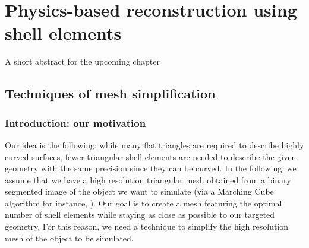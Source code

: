 \chapter{Physics-based reconstruction using shell elements}
\label{chap10}
\begin{shortAbstract}
A short abstract for the upcoming chapter \\
\end{shortAbstract}


\section{Techniques of mesh simplification}

\subsection{Introduction: our motivation}

Our idea is the following: while many flat triangles are required to describe highly curved surfaces, fewer triangular shell elements are needed to describe the given geometry with the same precision since they can be curved. In the following, we assume that we have a high resolution triangular mesh obtained from a binary segmented image of the object we want to simulate (via a Marching Cube algorithm for instance, \cite{Lorensen87}). Our goal is to create a mesh featuring the optimal number of shell elements while staying as close as possible to our targeted geometry. For this reason, we need a technique to simplify the high resolution mesh of the object to be simulated. 

\bigskip


